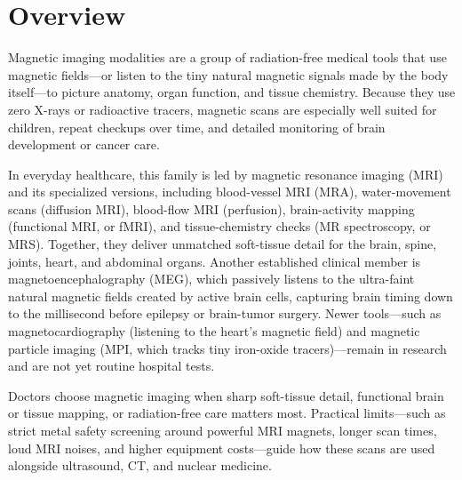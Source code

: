\label{ch:infographic-magnetic-imaging-overview}

\section{Overview}

Magnetic imaging modalities are a group of radiation-free medical tools that use magnetic fields---or listen to the tiny natural magnetic signals made by the body itself---to picture anatomy, organ function, and tissue chemistry. Because they use zero X-rays or radioactive tracers, magnetic scans are especially well suited for children, repeat checkups over time, and detailed monitoring of brain development or cancer care.

In everyday healthcare, this family is led by magnetic resonance imaging (MRI) and its specialized versions, including blood-vessel MRI (MRA), water-movement scans (diffusion MRI), blood-flow MRI (perfusion), brain-activity mapping (functional MRI, or fMRI), and tissue-chemistry checks (MR spectroscopy, or MRS). Together, they deliver unmatched soft-tissue detail for the brain, spine, joints, heart, and abdominal organs. Another established clinical member is magnetoencephalography (MEG), which passively listens to the ultra-faint natural magnetic fields created by active brain cells, capturing brain timing down to the millisecond before epilepsy or brain-tumor surgery. Newer tools---such as magnetocardiography (listening to the heart's magnetic field) and magnetic particle imaging (MPI, which tracks tiny iron-oxide tracers)---remain in research and are not yet routine hospital tests.

Doctors choose magnetic imaging when sharp soft-tissue detail, functional brain or tissue mapping, or radiation-free care matters most. Practical limits---such as strict metal safety screening around powerful MRI magnets, longer scan times, loud MRI noises, and higher equipment costs---guide how these scans are used alongside ultrasound, CT, and nuclear medicine.

